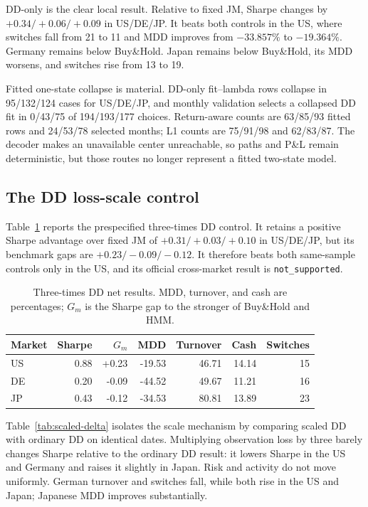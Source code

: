 \documentclass[11pt]{article}
\newcommand{\BH}{Buy\&Hold}
\begin{document}
DD-only is the clear local result. Relative to fixed JM, Sharpe changes by
\(+0.34/+0.06/+0.09\) in US/DE/JP. It beats both controls in the US,
where switches fall from 21 to 11 and MDD improves from \(-33.857\%\) to
\(-19.364\%\). Germany remains below \BH{}. Japan remains below \BH{}, its MDD
worsens, and switches rise from 13 to 19.

Fitted one-state collapse is material. DD-only fit--lambda rows collapse in
95/132/124 cases for US/DE/JP, and monthly validation selects a collapsed DD
fit in 0/43/75 of 194/193/177 choices. Return-aware counts are 63/85/93 fitted
rows and 24/53/78 selected months; L1 counts are 75/91/98 and 62/83/87. The
decoder makes an unavailable center unreachable, so paths and P\&L remain
deterministic, but those routes no longer represent a fitted two-state model.

\subsection{The DD loss-scale control}

Table~\ref{tab:scaled-absolute} reports the prespecified three-times DD
control. It retains a positive Sharpe advantage over fixed JM of
\(+0.31/+0.03/+0.10\) in US/DE/JP, but its benchmark gaps are
\(+0.23/-0.09/-0.12\). It therefore beats both same-sample controls
only in the US, and its official cross-market result is
\texttt{not\_supported}.

\begin{table}[!htbp]
\centering
\caption{Three-times DD net results. MDD, turnover, and cash are percentages;
\(G_m\) is the Sharpe gap to the stronger of \BH{} and HMM.}
\label{tab:scaled-absolute}
\small
\begin{tabular}{lrrrrrr}
\toprule
Market & Sharpe & \(G_m\) & MDD & Turnover & Cash & Switches \\
\midrule
US & 0.88 & +0.23 & -19.53 & 46.71 & 14.14 & 15 \\
DE & 0.20 & -0.09 & -44.52 & 49.67 & 11.21 & 16 \\
JP & 0.43 & -0.12 & -34.53 & 80.81 & 13.89 & 23 \\
\bottomrule
\end{tabular}
\end{table}

Table~\ref{tab:scaled-delta} isolates the scale mechanism by comparing scaled
DD with ordinary DD on identical dates. Multiplying observation loss by three
barely changes Sharpe relative to the ordinary DD result: it lowers Sharpe in
the US and Germany and raises it slightly in Japan. Risk and activity do not
move uniformly. German turnover and switches fall, while both rise in the US
and Japan; Japanese MDD improves substantially.
\end{document}

